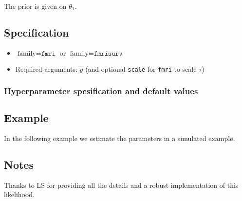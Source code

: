 \documentclass[a4paper,11pt]{article}
\begin{document}
The prior is given on $\theta_1$.

\subsection*{Specification}

\begin{itemize}
\item $\text{family}=\texttt{fmri}$ or $\text{family}=\texttt{fmrisurv}$
\item Required arguments: $y$ (and optional \texttt{scale} for
    \texttt{fmri} to scale $\tau$)
\end{itemize}

\subsubsection*{Hyperparameter spesification and default values}



\subsection*{Example}

In the following example we estimate the parameters in a simulated
example.


\subsection*{Notes}

Thanks to LS for providing all the details and a robust implementation
of this likelihood.
\end{document}

